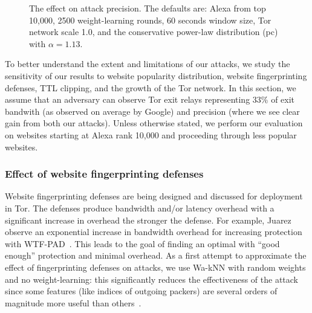 \begin{figure}[t]
{    \label{fig:wfdns:var:scale}
}
\caption{The effect on attack precision. The defaults are: Alexa from top 10,000,
2500 weight-learning rounds,
60 seconds window size, Tor network scale 1.0, and the conservative
power-law distribution (pc) with $\alpha=1.13$.}
\label{fig:wfdns:var}
\end{figure}
\fi

To better understand the extent and limitations of our attacks, we
study the sensitivity of our results to website popularity distribution,
website fingerprinting defenses, TTL clipping, and the growth of the Tor
network.  In this section, we assume that an adversary can observe Tor
exit relays representing 33\% of exit bandwith (as observed on average
by Google) and precision (where we see clear gain from both our
attacks).  Unless otherwise stated, we perform our evaluation on
websites starting at Alexa rank 10,000 and proceeding through less
popular websites.



\subsubsection{Effect of website fingerprinting defenses}

Website fingerprinting defenses are being
designed and discussed for deployment in Tor.
The defenses produce bandwidth and/or latency overhead with a significant
increase in overhead the stronger the defense. For example, Juarez \ea
observe an exponential increase in bandwidth overhead for increasing protection
with WTF-PAD~\cite{DBLP:journals/corr/JuarezIPDW15}.
This leads to the goal of finding an optimal with ``good enough''
protection and minimal overhead.
As a first attempt to approximate the effect of fingerprinting
defenses on \name attacks, we use Wa-kNN with
random weights and no weight-learning: this significantly reduces the
effectiveness of the attack since some features (like indices of outgoing
packers) are several orders of magnitude more useful
than others~\cite{DBLP:journals/corr/JuarezIPDW15}.

